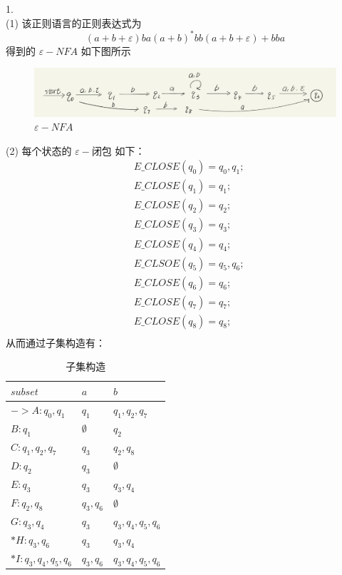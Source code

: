 \documentclass{article}
\begin{document}
1.\\
(1) 该正则语言的正则表达式为
\[
(a + b + \varepsilon) b a (a + b) ^ * b b (a + b + \varepsilon) + b b a    
\]
得到的 $\varepsilon - NFA$ 如下图所示
\begin{figure}[htbp]
	\centering
    \includegraphics[width=43em,height=!]{NFA1.jpg}
	\caption{$\varepsilon - NFA$}
\end{figure}

(2) 每个状态的 $\varepsilon - \mbox{闭包}$ 如下：\\
\[
\begin{aligned}
& E\_CLOSE(q_0) = {q_0, q_1}; \\
& E\_CLOSE(q_1) = {q_1}; \\
& E\_CLOSE(q_2) = {q_2}; \\
& E\_CLOSE(q_3) = {q_3}; \\
& E\_CLOSE(q_4) = {q_4}; \\
& E\_CLSOE(q_5) = {q_5, q_6}; \\
& E\_CLOSE(q_6) = {q_6}; \\ 
& E\_CLOSE(q_7) = {q_7}; \\
& E\_CLOSE(q_8) = {q_8}; \\
\end{aligned}
\]
从而通过子集构造有：
\begin{table}[h!]
    \begin{center}
      \caption{子集构造}
      \setlength{\tabcolsep}{8mm} {
      \begin{tabular}{|l|l|l|} 
        \textbf{$subset$} & \textbf{$a$} & \textbf{$b$} \\
        \hline
        $-> A: q_0, q_1$ & $q_1$ & $q_1, q_2, q_7$ \\ 
        $B: q_1$ & $\emptyset$ & $q_2$ \\
        $C :q_1, q_2, q_7$ & $q_3$ & $q_2, q_8$ \\
        $D: q_2$ & $q_3$ & $\emptyset$ \\
        $E: q_3$ & $q_3$ & $q_3, q_4$ \\
        $F: q_2, q_8$ & $q_3, q_6$ & $\emptyset$ \\
        $G: q_3, q_4$ & $q_3$ & $q_3, q_4, q_5, q_6$ \\
        $* H: q_3, q_6$ & $q_3$ & $q_3, q_4$ \\
        $* I: q_3, q_4, q_5, q_6$ & $q_3, q_6$ & $q_3, q_4, q_5, q_6$ \\
      \end{tabular} 
      }
    \end{center}
\end{table}
\end{document}
